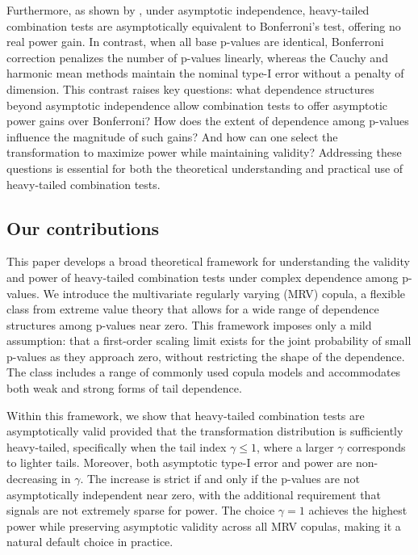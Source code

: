 \documentclass[12pt]{article}
\theoremstyle{plain}
\theoremstyle{plain}
\theoremstyle{definition}
\begin{document}
Furthermore, as shown by \citep{gui2023aggregating}, under asymptotic independence, heavy-tailed combination tests are asymptotically equivalent to Bonferroni’s test, offering no real power gain. 
In contrast, when all base p-values are identical, Bonferroni correction penalizes the number of p-values linearly, whereas the Cauchy and harmonic mean methods maintain the nominal type-I error without a penalty of dimension. This contrast raises key questions: what dependence structures beyond asymptotic independence allow combination tests to offer asymptotic power gains over Bonferroni? How does the extent of dependence among p-values influence the magnitude of such gains? And how can one select the transformation to maximize power while maintaining validity? Addressing these questions is essential for both the theoretical understanding and practical use of heavy-tailed combination tests.



\subsection{Our contributions} 
This paper develops a broad theoretical framework for understanding the validity and power of heavy-tailed combination tests under complex dependence among p-values. We introduce the multivariate regularly varying (MRV) copula, a flexible class from extreme value theory that allows for a wide range of dependence structures among p-values near zero. This framework imposes only a mild assumption: that a first-order scaling limit exists for the joint probability of small 
p-values as they approach zero, without restricting the shape of the dependence. The class includes a range of commonly used copula models and accommodates both weak and strong forms of tail dependence.


Within this framework, we show that heavy-tailed combination tests are asymptotically valid provided that the transformation distribution is sufficiently heavy-tailed, specifically when the tail index $\gamma \leq 1$, where a larger $\gamma$ corresponds to lighter tails. Moreover, both asymptotic type-I error and power are non-decreasing in $\gamma$. The increase is strict if and only if the 
p-values are not asymptotically independent near zero, with the additional requirement that signals are not extremely sparse for power.
 The choice $\gamma = 1$ achieves the highest power while preserving asymptotic validity across all MRV copulas, making it a natural default choice in practice.
\end{document}
